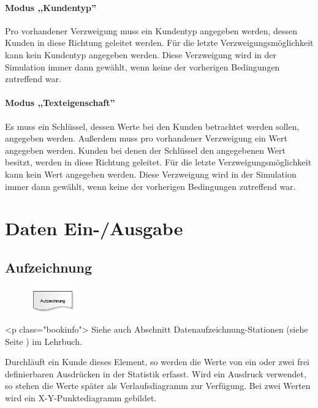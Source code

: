 \subsubsection*{Modus ,,Kundentyp''}

Pro vorhandener Verzweigung muss ein Kundentyp angegeben werden, dessen Kunden in diese Richtung
geleitet werden. Für die letzte Verzweigungsmöglichkeit kann kein Kundentyp angegeben werden. Diese Verzweigung
wird in der Simulation immer dann gewählt, wenn keine der vorherigen Bedingungen zutreffend war.

\subsubsection*{Modus ,,Texteigenschaft''}

Es muss ein Schlüssel, dessen Werte bei den Kunden betrachtet werden sollen, angegeben werden.
Außerdem muss pro vorhandener Verzweigung ein Wert angegeben werden. Kunden bei denen der Schlüssel
den angegebenen Wert besitzt, werden in diese Richtung geleitet. Für die letzte Verzweigungsmöglichkeit
kann kein Wert angegeben werden. Diese Verzweigung wird in der Simulation immer dann gewählt,
wenn keine der vorherigen Bedingungen zutreffend war.





\chapter{Daten Ein-/Ausgabe}

\section{Aufzeichnung}
\label{ref:ModelElementRecord}

\begin{figure}
\vspace{-22pt}
\includegraphics[width=2cm]{imageModelElementRecord.png}
\vspace{-22pt}
\end{figure}

<p class="bookinfo">
Siehe auch Abschnitt Datenaufzeichnung-Stationen (siehe Seite \pageref{ref:book:9.3.4}) im Lehrbuch.

Durchläuft ein Kunde dieses Element, so werden die Werte von ein oder zwei frei definierbaren Ausdrücken
in der Statistik erfasst. Wird ein Ausdruck verwendet, so stehen die Werte später als Verlaufsdiagramm
zur Verfügung. Bei zwei Werten wird ein X-Y-Punktediagramm gebildet.

